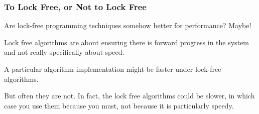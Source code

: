\begin{frame}
\frametitle{To Lock Free, or Not to Lock Free}

Are lock-free programming techniques somehow better for performance? Maybe!

Lock free algorithms are about ensuring there is forward progress in the system and not really specifically about speed. 

A particular algorithm implementation might be faster under lock-free algorithms.

But often they are not. In fact, the lock free algorithms could be slower, in which case you use them because you must, not because it is particularly speedy.

\end{frame}




